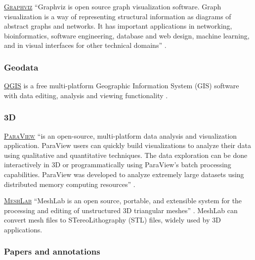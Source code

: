 \vspace{0.4cm}

\noindent {} \textsc{\href{http://www.graphviz.org/}{Graphviz}} ``Graphviz is open source graph visualization software. Graph visualization is a way of representing structural information as diagrams of abstract graphs and networks. It has important applications in networking, bioinformatics,  software engineering, database and web design, machine learning, and in visual interfaces for other technical domains'' \cite{graphviz_graph_2015}.

\subsubsection{Geodata}

\noindent {} \textsc{\href{http://www.qgis.org/en/site/}{QGIS}} is a free multi-platform Geographic Information System (GIS) software with data editing, analysis and viewing functionality \cite{qgis.org_qgis_2015}.

\subsubsection{3D} 

\noindent {} \textsc{\href{http://www.paraview.org/}{ParaView}}  ``is an open-source, multi-platform data analysis and visualization application. ParaView users can quickly build visualizations to analyze their data using qualitative and quantitative techniques. The data exploration can be done interactively in 3D or programmatically using ParaView’s batch processing capabilities. ParaView was developed to analyze extremely large datasets using distributed memory computing resources'' \cite{paraview.org_paraview_2015}.

\vspace{0.4cm}

\noindent {} \textsc{\href{http://meshlab.sourceforge.net/}{MeshLab}}  ``MeshLab is an open source, portable, and extensible system for the processing and editing of unstructured 3D triangular meshes'' \cite{meshlab.sf.net_meshlab_2015}. MeshLab can convert mesh files to STereoLithography (STL) files, widely used by 3D applications.


\subsubsection{Papers and annotations}

